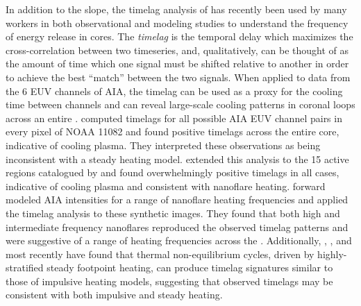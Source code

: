In addition to the \dem{} slope, the timelag analysis of \citet{viall_evidence_2012} has recently been used by many workers in both observational and modeling studies to understand the frequency of energy release in \AR{} cores. The \textit{timelag} is the temporal delay which maximizes the cross-correlation between two timeseries, and, qualitatively, can be thought of as the amount of time which one signal must be shifted relative to another in order to achieve the best ``match'' between the two signals. When applied to data from the 6 EUV channels of AIA, the timelag can be used as a proxy for the cooling time between channels and can reveal large-scale cooling patterns in coronal loops across an entire \AR{}. \citeauthor{viall_evidence_2012} computed timelags for all possible AIA EUV channel pairs in every pixel of \AR{} NOAA 11082 and found positive timelags across the entire \AR{} core, indicative of cooling plasma. They interpreted these observations as being inconsistent with a steady heating model. \citet{viall_survey_2017} extended this analysis to the 15 active regions catalogued by \citet{warren_systematic_2012} and found overwhelmingly positive timelags in all cases, indicative of cooling plasma and consistent with nanoflare heating. \citet{bradshaw_patterns_2016} forward modeled AIA intensities for a range of nanoflare heating frequencies and applied the timelag analysis to these synthetic images. They found that both high and intermediate frequency nanoflares reproduced the observed timelag patterns and were suggestive of a range of heating frequencies across the \AR{}.  Additionally, \citet{lionello_can_2016}, \citet{winebarger_investigation_2016}, and most recently \citet{winebarger_identifying_2018} have found that thermal non-equilibrium cycles, driven by highly-stratified steady footpoint heating, can produce timelag signatures similar to those of impulsive heating models, suggesting that observed timelags may be consistent with both impulsive and steady heating. 

